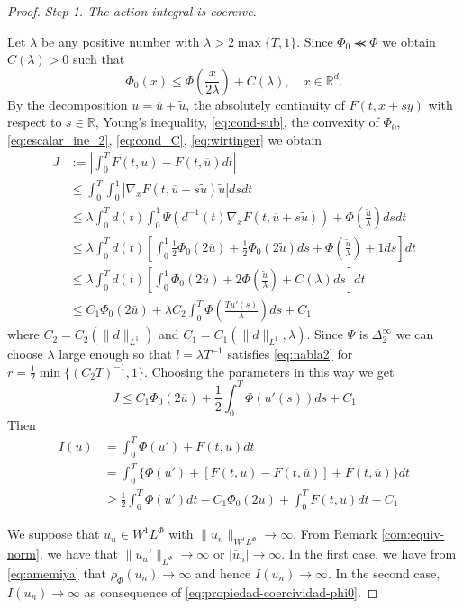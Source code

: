 \documentclass[twoside]{article}
\theoremstyle{remark}
\newcommand{\orlnor}{\|_{L^{\Phi}}}
\newcommand{\lphi}{L^{\Phi}}
\newcommand{\wphi}{W^{1}\lphi}
\newcommand{\sobnor}{\|_{W^{1}\lphi}}
\newcommand{\rr}{\mathbb{R}}
\renewcommand{\leq}{\leqslant}
\renewcommand{\geq}{\geqslant}
\begin{document}
\begin{proof} \emph{Step 1. The action integral is coercive}.
  
  
  Let $\lambda$ be any positive number with $\lambda>2\max\{T,1\}$. Since $\Phi_0\llcurly \Phi$ we obtain $C(\lambda)>0$ such that 
  \begin{equation}\label{eq:cond_C}
    \Phi_0(x)\leq \Phi\left(\frac{x}{2\lambda}\right)+C(\lambda),\quad  x\in\rr^d. 
  \end{equation}
By the decomposition $u=\overline{u}+\tilde{u}$, the absolutely continuity of $F(t,x+sy)$ with respect to $s\in\rr$,  Young's inequality, \eqref{eq:cond-sub}, the convexity of $\Phi_0$, \eqref{eq:escalar_ine_2}, \eqref{eq:cond_C}, \eqref{eq:wirtinger}  we obtain
\begin{equation*}\label{eq:cota-dif-F}
\begin{split}
J&:=\left|\int_0^T F(t,u)-F(t,\overline{u})dt\right|
\\
&\leq \int_0^T \int_0^1 |\nabla_x F(t,\overline{u}+s\tilde{u})\tilde{u}|dsdt
\\
&\leq
\lambda \int_0^T d(t) \int_0^1 \Psi\left(d^{-1}(t)\nabla_xF(t,\overline{u}+s\tilde{u})\right)+\Phi\left(\frac{\tilde{u}}{\lambda}\right)dsdt
\\
&\leq
\lambda\int_0^T d(t)\left[\int_0^1 \frac12\Phi_0(2\overline{u})+\frac12\Phi_0(2\tilde{u})ds+\Phi\left(\frac{\tilde{u}}{\lambda}\right)+1 ds\right]dt
\\
&\leq
\lambda\int_0^T d(t)\left[\int_0^1 \Phi_0(2\overline{u})+2\Phi\left(\frac{\tilde{u}}{\lambda}\right)+C(\lambda) ds\right]dt
\\
&\leq C_1 \Phi_0(2\overline{u})+\lambda C_2 \int_0^T \Phi\left(\frac{Tu'(s)}{\lambda}\right)ds+C_1
\end{split}
\end{equation*}
where $C_2=C_2(\|d\|_{L^1})$ and $C_1=C_1(\|d\|_{L^1},\lambda)$.  Since $\Psi$ is $\Delta_2^{\infty}$ we can choose $\lambda$ large enough so that $l=\lambda T^{-1}$ satisfies  \eqref{eq:nabla2} for $r=\frac12 \min\{(C_2T)^{-1},1\}$. Choosing the parameters in this way we get
\[
 J\leq C_1 \Phi_0(2\overline{u})+\frac12 \int_0^T \Phi\left(u'(s)\right)ds+C_1
\]
Then
\begin{equation}
\begin{split}
I(u)&=\int_0^T  \Phi(u')+F(t,u)dt\\
&= \int_0^T \{\Phi(u')+[F(t,u)-F(t,\overline{u})]+F(t,\overline{u})\}dt
\\
&\geq
\frac12\int_0^T \Phi(u')dt-C_1\Phi_0(2 \overline{u})+\int_0^T F(t,\overline{u})dt-C_1
\end{split}
\end{equation}

We suppose that $u_n\in\wphi$ with $\|u_n\sobnor\to\infty$. From Remark \ref{com:equiv-norm}, we have that $\|u_u'\orlnor \to \infty$ or $|\overline{u}_n|\to \infty$. In the first case, we have from \eqref{eq:amemiya} that $\rho_\Phi(u_n)\to\infty$ and hence  $I(u_n)\to\infty$. In the second case,  $I(u_n)\to\infty$ as consequence of \eqref{eq:propiedad-coercividad-phi0}.


\end{proof}
\end{document}
